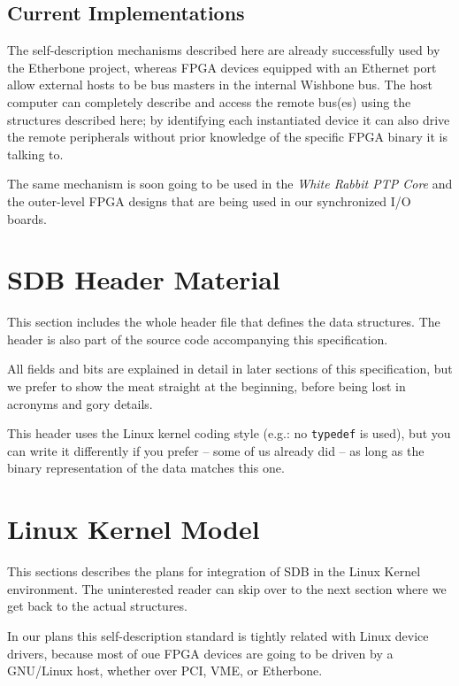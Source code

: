 \documentclass[a4paper, 12pt]{article}
\begin{document}
\subsection{Current Implementations}

The self-description mechanisms described here are already
successfully used by the Etherbone project, whereas FPGA devices
equipped with an Ethernet port allow external hosts to be bus masters
in the internal Wishbone bus.  The host computer can completely
describe and access the remote bus(es) using the structures described
here; by identifying each instantiated device it can also drive the
remote peripherals without prior knowledge of the specific FPGA binary
it is talking to.

The same mechanism is soon going to be used in the \textit{White
Rabbit PTP Core} and the outer-level FPGA designs that are
being used in our synchronized I/O boards.


\section{SDB Header Material}

This section includes the whole header file that defines the data
structures. The header is also part of the source code accompanying
this specification.

All fields and bits are explained in detail in later sections of this
specification, but we prefer to show the meat straight at the
beginning, before being lost in acronyms and gory details.

This header uses the Linux kernel coding style (e.g.: no \texttt{typedef} is used),
but you can write it differently if you prefer -- some of us already did -- as
long as the binary representation of the data matches this one.

\footnotesize

\normalsize

\section{Linux Kernel Model}

This sections describes the plans for integration of SDB in the Linux
Kernel environment.  The uninterested reader can skip over to the next
section where we get back to the actual structures.

In our plans this self-description standard is tightly related with
Linux device drivers, because most of oue FPGA devices are going to be
driven by a GNU/Linux host, whether over PCI, VME, or Etherbone.
\end{document}
